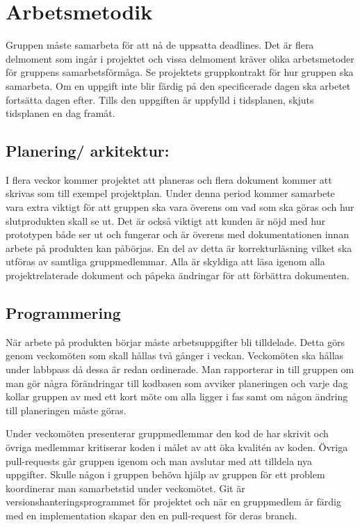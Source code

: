 \documentclass{liu_mall}
\begin{document}
\newpage
\section{Arbetsmetodik}
    Gruppen måste samarbeta för att nå de uppsatta deadlines. Det är flera delmoment som ingår i projektet och vissa delmoment kräver olika arbetsmetoder för gruppens samarbetsförmåga. Se projektets gruppkontrakt för hur gruppen ska samarbeta. Om en uppgift inte blir färdig på den specificerade dagen ska arbetet fortsätta dagen efter. Tills den uppgiften är uppfylld i tidsplanen, skjuts tidsplanen en dag framåt.
    
    \subsection{Planering/ arkitektur:}
        I flera veckor kommer projektet att planeras och flera dokument kommer att skrivas som till exempel projektplan. Under denna period kommer samarbete vara extra viktigt för att gruppen ska vara överens om vad som ska göras och hur slutprodukten skall se ut. Det är också viktigt att kunden är nöjd med hur prototypen både ser ut och fungerar och är överens med dokumentationen innan arbete på produkten kan påbörjas. En del av detta är korrekturläsning vilket ska utföras av samtliga gruppmedlemmar. Alla är skyldiga att läsa igenom alla projektrelaterade dokument och påpeka ändringar för att förbättra dokumenten.
        
    \subsection{Programmering}
        När arbete på produkten börjar måste arbetsuppgifter bli tilldelade. Detta görs genom veckomöten som skall hållas två gånger i veckan. Veckomöten ska hållas under labbpass då dessa är redan ordinerade. Man rapporterar in till gruppen om man gör några förändringar till kodbasen som avviker planeringen och varje dag kollar gruppen av med ett kort möte om alla ligger i fas samt om någon ändring till planeringen måste göras.
        
        Under veckomöten presenterar gruppmedlemmar den kod de har skrivit och övriga medlemmar kritiserar koden i målet av att öka kvalitén av koden. Övriga pull-requests går gruppen igenom och man avslutar med att tilldela nya uppgifter. Skulle någon i gruppen behöva hjälp av gruppen för ett problem koordinerar man samarbetstid under veckomötet. Git är versionshanteringsprogrammet för projektet och när en gruppmedlem är färdig med en implementation skapar den en pull-request för deras branch.
\end{document}
